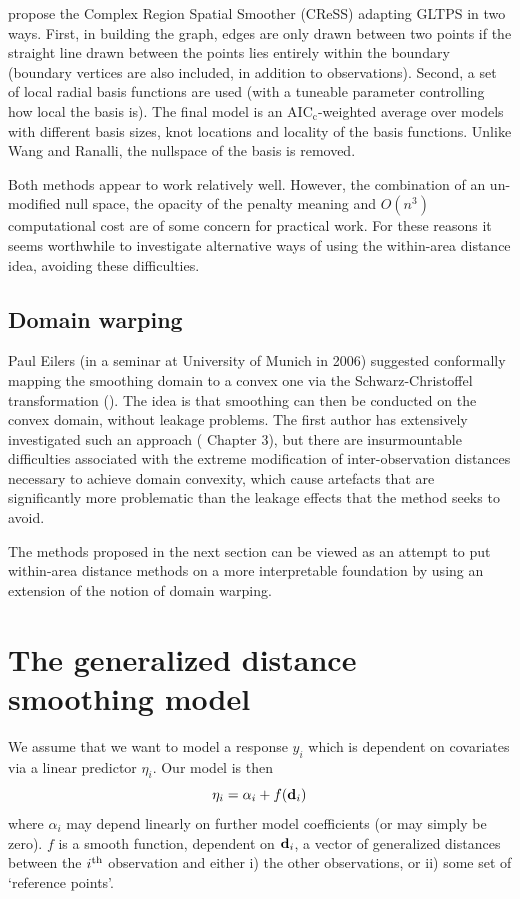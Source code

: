 \documentclass[smallextended]{svjour3}       %
\begin{document}
\cite{ScottHayward:2011tc} propose the Complex Region Spatial Smoother (CReSS) adapting GLTPS in two ways. First, in building the graph, edges are only drawn between two points if the straight line drawn between the points lies entirely within the boundary (boundary vertices are also included, in addition to observations). Second, a set of local radial basis functions are used (with a tuneable parameter controlling how local the basis is). The final model is an AIC$_\text{c}$-weighted average over models with different basis sizes, knot locations and locality of the basis functions. Unlike Wang and Ranalli, the nullspace of the basis is removed.

Both methods appear to work relatively well. However, the combination of an un-modified null space, the opacity of the penalty meaning and $O(n^3)$ computational cost are of some concern for practical work. For these reasons it seems worthwhile to investigate alternative ways of using the within-area distance idea, avoiding these difficulties.

\subsection*{Domain warping}


Paul Eilers (in a seminar at University of Munich in 2006) suggested conformally mapping the smoothing domain to a convex one  via the Schwarz-Christoffel transformation (\cite{Driscoll:2002tq}). The idea is that smoothing can then be conducted on the convex domain, without leakage problems. The first author has extensively investigated such an approach (\cite{Miller:2012wy} Chapter 3), but there are insurmountable difficulties associated with the extreme modification of inter-observation distances necessary to achieve domain convexity, which cause artefacts that are significantly more problematic than the leakage effects that the method seeks to avoid. 

The methods proposed in the next section can be viewed as an attempt to put within-area distance methods on a more interpretable foundation by using an extension of the notion of domain warping. 


\section{The generalized distance smoothing model}
\label{proposed-model}

We assume that we want to model a response $y_i$ which is dependent on covariates via a linear predictor $\eta_i$. Our model is then
$$
\eta_i = \alpha_i + f({\bf d}_i)
$$
where $\alpha_i$ may depend linearly on further model coefficients (or may simply be zero). $f$ is a smooth function, dependent on ${\bf d}_i$, a vector of generalized distances between the $i^{\rm th}$ observation and either i) the other observations, or ii) some set of `reference points'. 
\end{document}
